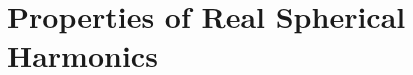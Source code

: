 \documentclass[11pt]{article}
\numberwithin{equation}{section}
\begin{document}
\appendix






























































\section{Properties of Real Spherical Harmonics}
\end{document}
